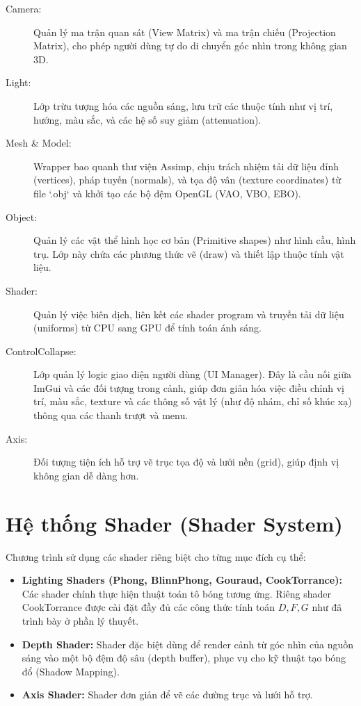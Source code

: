 \begin{description}
	\item[Camera:] Quản lý ma trận quan sát (View Matrix) và ma trận chiếu (Projection Matrix), cho phép người dùng tự do di chuyển góc nhìn trong không gian 3D.
	\item[Light:] Lớp trừu tượng hóa các nguồn sáng, lưu trữ các thuộc tính như vị trí, hướng, màu sắc, và các hệ số suy giảm (attenuation).
	\item[Mesh \& Model:] Wrapper bao quanh thư viện Assimp, chịu trách nhiệm tải dữ liệu đỉnh (vertices), pháp tuyến (normals), và tọa độ vân (texture coordinates) từ file `.obj` và khởi tạo các bộ đệm OpenGL (VAO, VBO, EBO).
	\item[Object:] Quản lý các vật thể hình học cơ bản (Primitive shapes) như hình cầu, hình trụ. Lớp này chứa các phương thức vẽ (draw) và thiết lập thuộc tính vật liệu.
	\item[Shader:] Quản lý việc biên dịch, liên kết các shader program và truyền tải dữ liệu (uniforms) từ CPU sang GPU để tính toán ánh sáng.
	\item[ControlCollapse:] Lớp quản lý logic giao diện người dùng (UI Manager). Đây là cầu nối giữa ImGui và các đối tượng trong cảnh, giúp đơn giản hóa việc điều chỉnh vị trí, màu sắc, texture và các thông số vật lý (như độ nhám, chỉ số khúc xạ) thông qua các thanh trượt và menu.
	\item[Axis:] Đối tượng tiện ích hỗ trợ vẽ trục tọa độ và lưới nền (grid), giúp định vị không gian dễ dàng hơn.
\end{description}

\section{Hệ thống Shader (Shader System)}

Chương trình sử dụng các shader riêng biệt cho từng mục đích cụ thể:
\begin{itemize}
	\item \textbf{Lighting Shaders (Phong, BlinnPhong, Gouraud, CookTorrance):} Các shader chính thực hiện thuật toán tô bóng tương ứng. Riêng shader CookTorrance được cài đặt đầy đủ các công thức tính toán $D, F, G$ như đã trình bày ở phần lý thuyết.
	
	\item \textbf{Depth Shader:} Shader đặc biệt dùng để render cảnh từ góc nhìn của nguồn sáng vào một bộ đệm độ sâu (depth buffer), phục vụ cho kỹ thuật tạo bóng đổ (Shadow Mapping).
	
	\item \textbf{Axis Shader:} Shader đơn giản để vẽ các đường trục và lưới hỗ trợ.
\end{itemize}

